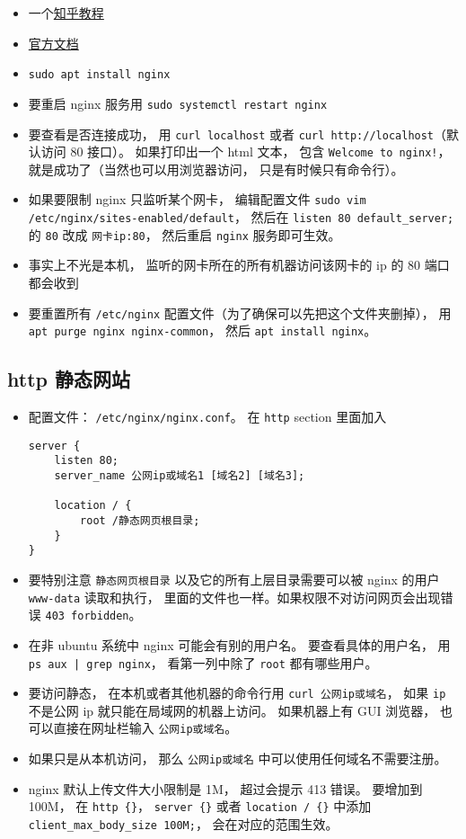 
\begin{itemize}
\item 一个\href{https://zhuanlan.zhihu.com/p/80600540}{知乎教程}
\item \href{https://nginx.org/en/docs/}{官方文档}
\item \verb`sudo apt install nginx`
\item 要重启 nginx 服务用 \verb`sudo systemctl restart nginx`
\item 要查看是否连接成功， 用 \verb`curl localhost` 或者 \verb`curl http://localhost`（默认访问 80 接口）。 如果打印出一个 html 文本， 包含 \verb`Welcome to nginx!`， 就是成功了（当然也可以用浏览器访问， 只是有时候只有命令行）。
\item 如果要限制 nginx 只监听某个网卡， 编辑配置文件 \verb`sudo vim /etc/nginx/sites-enabled/default`， 然后在 \verb`listen 80 default_server;` 的 \verb`80` 改成 \verb`网卡ip:80`， 然后重启 \verb`nginx` 服务即可生效。
\item 事实上不光是本机， 监听的网卡所在的所有机器访问该网卡的 ip 的 80 端口都会收到
\item 要重置所有 \verb`/etc/nginx` 配置文件（为了确保可以先把这个文件夹删掉）， 用 \verb`apt purge nginx nginx-common`， 然后 \verb`apt install nginx`。
\end{itemize}

\subsection{http 静态网站}
\begin{itemize}
\item 配置文件： \verb`/etc/nginx/nginx.conf`。 在 \verb`http` section 里面加入
\begin{lstlisting}[language=none]
server {
    listen 80;
    server_name 公网ip或域名1 [域名2] [域名3];
    
    location / {
        root /静态网页根目录;
    }
}
\end{lstlisting}
\item 要特别注意 \verb`静态网页根目录` 以及它的所有上层目录需要可以被 nginx 的用户 \verb`www-data` 读取和执行， 里面的文件也一样。如果权限不对访问网页会出现错误 \verb`403 forbidden`。
\item 在非 ubuntu 系统中 nginx 可能会有别的用户名。  要查看具体的用户名， 用 \verb`ps aux | grep nginx`， 看第一列中除了 \verb`root` 都有哪些用户。
\item 要访问静态， 在本机或者其他机器的命令行用 \verb`curl 公网ip或域名`， 如果 \verb`ip` 不是公网 ip 就只能在局域网的机器上访问。 如果机器上有 GUI 浏览器， 也可以直接在网址栏输入 \verb`公网ip或域名`。
\item 如果只是从本机访问， 那么 \verb`公网ip或域名` 中可以使用任何域名不需要注册。
\item nginx 默认上传文件大小限制是 1M， 超过会提示 413 错误。 要增加到 100M， 在 \verb`http {}`， \verb`server {}` 或者 \verb`location / {}` 中添加 \verb`client_max_body_size 100M;`， 会在对应的范围生效。
\end{itemize}


